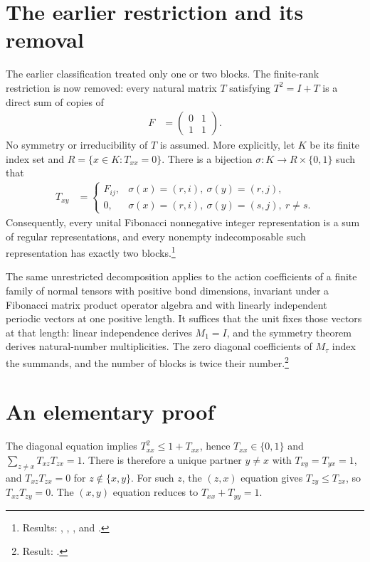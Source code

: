 \documentclass{article}
\begin{document}
\section{The earlier restriction and its removal}
The earlier classification treated only one or two blocks. The finite-rank
restriction is now removed: every natural matrix $T$ satisfying $T^2=I+T$
is a direct sum of copies of
\begin{align}
    F & =\begin{pmatrix}0&1\\1&1\end{pmatrix}.
    \label{eq:glm23_fib_regular}
\end{align}
No symmetry or irreducibility of $T$ is assumed. More explicitly, let
$K$ be its finite index set and $R=\{x\in K:T_{xx}=0\}$. There is a bijection
$\sigma:K\longrightarrow R\times\{0,1\}$ such that
\begin{align}
    T_{xy} & =
    \begin{cases}
        F_{ij}, & \sigma(x)=(r,i),\ \sigma(y)=(r,j),          \\
        0,      & \sigma(x)=(r,i),\ \sigma(y)=(s,j),\ r\ne s.
    \end{cases}
    \label{eq:glm23_fib_direct_sum}
\end{align}
Consequently, every unital Fibonacci nonnegative integer representation is a
sum of regular representations, and every nonempty indecomposable such
representation has exactly two blocks.\footnote{Results:
    ,
    ,
    , and
    .}

The same unrestricted decomposition applies to the action coefficients of
a finite family of normal tensors with positive bond dimensions, invariant
under a Fibonacci matrix product operator algebra and with linearly
independent periodic vectors at one positive length. It suffices that the
unit fixes those vectors at that length: linear independence derives
$M_1=I$, and the symmetry theorem derives natural-number multiplicities.
The zero diagonal coefficients of $M_\tau$ index the summands, and the
number of blocks is twice their number.\footnote{Result:
    .}

\section{An elementary proof}
The diagonal equation implies $T_{xx}^2\leq1+T_{xx}$, hence
$T_{xx}\in\{0,1\}$ and $\sum_{z\ne x}T_{xz}T_{zx}=1$.
There is therefore a unique partner $y\ne x$ with
$T_{xy}=T_{yx}=1$, and $T_{xz}T_{zx}=0$ for $z\notin\{x,y\}$.
For such $z$, the $(z,x)$ equation gives $T_{zy}\leq T_{zx}$, so
$T_{xz}T_{zy}=0$. The $(x,y)$ equation reduces to
$T_{xx}+T_{yy}=1$.
\end{document}
